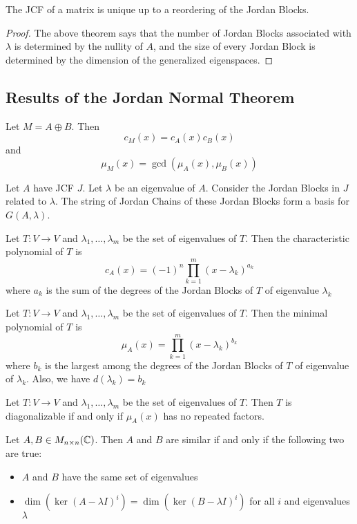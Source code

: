 \documentclass[a4paper]{article}
\begin{document}
\begin{crl}{}{} The JCF of a matrix is unique up to a reordering of the Jordan Blocks. \tcbline
\begin{proof}
The above theorem says that the number of Jordan Blocks associated with $\lambda$ is determined by the nullity of $A$, and the size of every Jordan Block is determined by the dimension of the generalized eigenspaces. 
\end{proof}
\end{crl}

\subsection{Results of the Jordan Normal Theorem}
\begin{lmm}{}{} Let $M=A\oplus B$. Then $$c_M(x)=c_A(x)c_B(x)$$ and $$\mu_M(x)=\gcd(\mu_A(x),\mu_B(x))$$
\end{lmm}

\begin{prp}{}{} Let $A$ have JCF $J$.  Let $\lambda$ be an eigenvalue of $A$. Consider the Jordan Blocks in $J$ related to $\lambda$. The string of Jordan Chains of these Jordan Blocks form a basis for $G(A,\lambda)$. 
\end{prp}

\begin{thm}{}{} Let $T:V\to V$ and $\lambda_1,\dots,\lambda_m$ be the set of eigenvalues of $T$. Then the characteristic polynomial of $T$ is $$c_A(x)=(-1)^n\prod_{k=1}^m(x-\lambda_k)^{a_k}$$ where $a_k$ is the sum of the degrees of the Jordan Blocks of $T$ of eigenvalue $\lambda_k$
\end{thm}

\begin{thm}{}{} Let $T:V\to V$ and $\lambda_1,\dots,\lambda_m$ be the set of eigenvalues of $T$. Then the minimal polynomial of $T$ is $$\mu_A(x)=\prod_{k=1}^m(x-\lambda_k)^{b_k}$$ where $b_k$ is the largest among the degrees of the Jordan Blocks of $T$ of eigenvalue of $\lambda_k$. Also, we have $d(\lambda_k)=b_k$
\end{thm}

\begin{thm}{}{} Let $T:V\to V$ and $\lambda_1,\dots,\lambda_m$ be the set of eigenvalues of $T$. Then $T$ is diagonalizable if and only if $\mu_A(x)$ has no repeated factors. 
\end{thm}

\begin{thm}{}{} Let $A,B\in M_{n\times n}(\mathbb{C})$. Then $A$ and $B$ are similar if and only if the following two are true: 
\begin{itemize}
\item $A$ and $B$ have the same set of eigenvalues
\item $\dim(\ker(A-\lambda I)^i)=\dim(\ker(B-\lambda I)^i)$ for all $i$ and eigenvalues $\lambda$ 
\end{itemize}
\end{thm}
\end{document}
